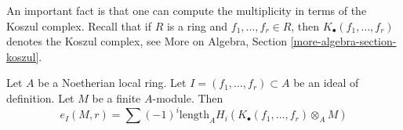 \noindent
An important fact is that one can compute the multiplicity in terms
of the Koszul complex. Recall that if $R$ is a ring and
$f_1, \ldots, f_r \in R$, then $K_\bullet(f_1, \ldots, f_r)$
denotes the Koszul complex, see
More on Algebra, Section \ref{more-algebra-section-koszul}.

\begin{theorem}
\label{theorem-multiplicity-with-koszul}
\begin{reference}
\cite[Theorem 1 in part B of Chapter IV]{Serre_algebre_locale}
\end{reference}
Let $A$ be a Noetherian local ring. Let $I = (f_1, \ldots, f_r) \subset A$
be an ideal of definition. Let $M$ be a finite $A$-module. Then
$$
e_I(M, r) = \sum
(-1)^i\text{length}_A H_i(K_\bullet(f_1, \ldots, f_r) \otimes_A M)
$$
\end{theorem}

